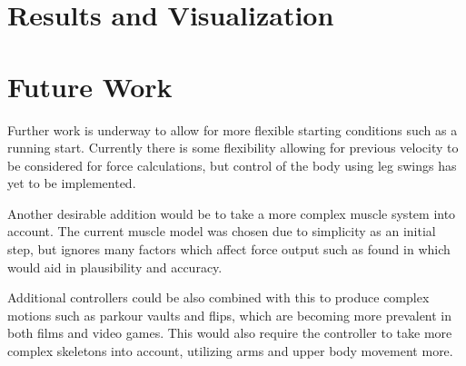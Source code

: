 \documentclass[landscape,26pt]{sciposter}
\begin{document}
\begin{minipage}[t]{14in}
	\section*{Results and Visualization}
		
	\section*{Future Work}
        Further work is underway to allow for more flexible starting conditions such as a running start.  Currently there is some flexibility allowing for previous velocity to be considered for force calculations, but control of the body using leg swings has yet to be implemented.

        Another desirable addition would be to take a more complex muscle system into account.  The current muscle model was chosen due to simplicity as an initial step, but ignores many factors which affect force output such as found in \cite{muscle_based_bipeds} which would aid in plausibility and accuracy.

        Additional controllers could be also combined with this to produce complex motions such as parkour vaults and flips, which are becoming more prevalent in both films and video games.  This would also require the controller to take more complex skeletons into account, utilizing arms and upper body movement more.
		
	\vspace{0.3in}

	{\small
	
    \nocite{muscle_based_bipeds}
    \nocite{anim_human_athletics}
    \nocite{composable_controllers}
    \nocite{falling_landing}

	
	}
\end{minipage}
\end{document}
